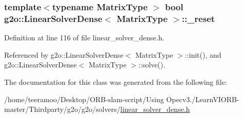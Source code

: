 \subsubsection[{\texorpdfstring{\+\_\+reset}{_reset}}]{\setlength{\rightskip}{0pt plus 5cm}template$<$typename Matrix\+Type $>$ bool {\bf g2o\+::\+Linear\+Solver\+Dense}$<$ Matrix\+Type $>$\+::\+\_\+reset\hspace{0.3cm}{\ttfamily [protected]}}\hypertarget{classg2o_1_1LinearSolverDense_a2d82ac52c9c24501cccee3ef3cb575fe}{}\label{classg2o_1_1LinearSolverDense_a2d82ac52c9c24501cccee3ef3cb575fe}


Definition at line 116 of file linear\+\_\+solver\+\_\+dense.\+h.



Referenced by g2o\+::\+Linear\+Solver\+Dense$<$ Matrix\+Type $>$\+::init(), and g2o\+::\+Linear\+Solver\+Dense$<$ Matrix\+Type $>$\+::solve().



The documentation for this class was generated from the following file\+:\begin{DoxyCompactItemize}
\item 
/home/teeramoo/\+Desktop/\+O\+R\+B-\/slam-\/script/\+Using Opecv3./\+Learn\+V\+I\+O\+R\+B-\/master/\+Thirdparty/g2o/g2o/solvers/\hyperlink{linear__solver__dense_8h}{linear\+\_\+solver\+\_\+dense.\+h}\end{DoxyCompactItemize}
